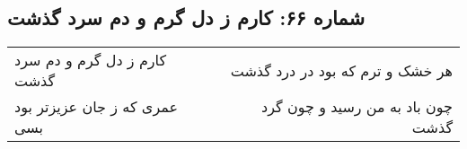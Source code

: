 \begin{center}
\section*{شماره ۶۶: کارم ز دل گرم و دم سرد گذشت}
\label{sec:066}
\begin{longtable}{l p{0.5cm} r}
کارم ز دل گرم و دم سرد گذشت
&&
هر خشک و ترم که بود در درد گذشت
\\
عمری که ز جان عزیزتر بود بسی
&&
چون باد به من رسید و چون گرد گذشت
\\
\end{longtable}
\end{center}
